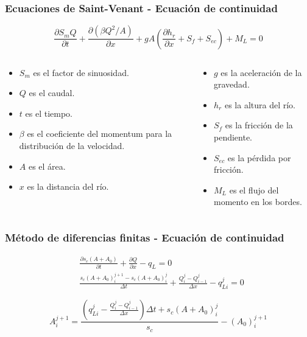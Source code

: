 \documentclass[17pt, t, lualatex]{beamer}
\begin{document}
\begin{frame}
  \frametitle{Ecuaciones de Saint-Venant - Ecuación de continuidad}
  \[
  \frac{\partial S_{m}Q}{\partial t} + \frac{\partial (\beta Q^{2} / A) }{\partial x} + g A \left(\frac{\partial h_{r}}{\partial x} + S_{f} + S_{ec}  \right) + M_{L} = 0
  \]
  \begin{columns}
    \begin{column}{0.5\textwidth}
      \begin{itemize}
        \item $S_{m}$ es el factor de sinuosidad.
        \item $Q$ es el caudal.
        \item $t$ es el tiempo.
        \item $\beta$ es el coeficiente del momentum para la distribución de la velocidad.
        \item $A$ es el área.
        \item $x$ es la distancia del río.
      \end{itemize}
    \end{column}

    \begin{column}{0.5\textwidth}
      \begin{itemize}
        \item $g$ es la aceleración de la gravedad.
        \item $h_{r}$ es la altura del río.
        \item $S_{f}$ es la fricción de la pendiente.
        \item $S_{ec}$ es la pérdida por fricción.
        \item $M_{L}$ es el flujo del momento en los bordes.
      \end{itemize}
    \end{column}
  \end{columns}
\end{frame}

\begin{frame}
  \frametitle{Método de diferencias finitas - Ecuación de continuidad}

  \begin{align*}
  &\frac{\partial s_{c} (A + A_{0})}{\partial t} + \frac{\partial Q}{\partial x} - q_{L} = 0 \\
  &\frac{s_{c} (A + A_{0})_{i}^{j+1} - s_{c}(A + A_{0})_{i}^{j} }{\Delta t} + \frac{Q_{i}^{j} - Q_{i-1}^{j} }{\Delta x} - q_{Li}^{j} = 0   
\end{align*}

  \[
  A_{i}^{j+1} = \frac{\left(q_{Li}^{j} - \frac{Q_{i}^{j} - Q_{i-1}^{j} }{\Delta x}  \right) \Delta t + s_{c} (A + A_{0})_{i}^{j}}{s_{c}} - (A_{0})_{i}^{j+1}
  \]
  
\end{frame}
\end{document}
